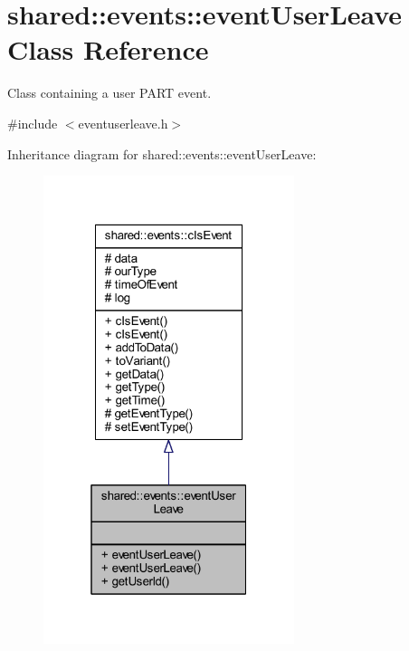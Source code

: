\hypertarget{classshared_1_1events_1_1event_user_leave}{\section{shared\-:\-:events\-:\-:event\-User\-Leave Class Reference}
\label{d9/d9f/classshared_1_1events_1_1event_user_leave}
}


Class containing a user P\-A\-R\-T event.  




{\ttfamily \#include $<$eventuserleave.\-h$>$}



Inheritance diagram for shared\-:\-:events\-:\-:event\-User\-Leave\-:\nopagebreak
\begin{figure}[H]
\begin{center}
\leavevmode
\includegraphics[width=208pt]{d6/dd9/classshared_1_1events_1_1event_user_leave__inherit__graph}
\end{center}
\end{figure}


